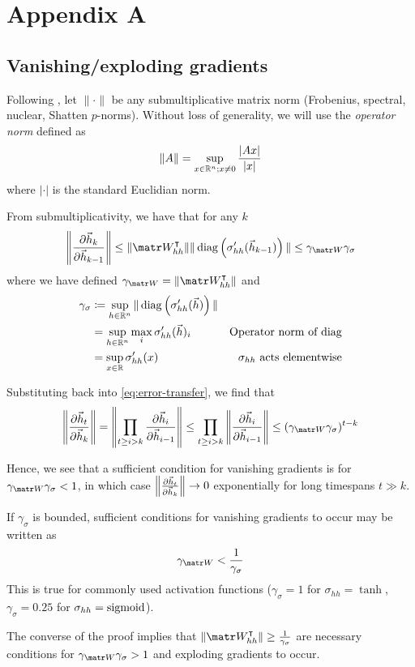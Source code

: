 \chapter{Appendix A}

\section{Vanishing/exploding gradients}\label{sec:vanishing-exploding-gradients}

Following \citet{Pascanu2012}, let $\| \cdot \|$ be any
submultiplicative matrix norm (\eg Frobenius, spectral, nuclear, Shatten
$p$-norms). Without loss of generality, we will use the \emph{operator norm}
defined as
\begin{equation}
    \| A \| = \sup_{x \in \mathbb{R}^n; x \neq 0} \frac{|A x|}{|x|}
\end{equation}
where $|\cdot|$ is the standard Euclidian norm.

From submultiplicativity, we have that for any $k$
\begin{equation}
    \left\| \frac{\pd \h_k}{\pd \h_{k-1}} \right\|
    \leq \| \W_{hh}^\tp \| \| \diag\left( \sigma_{hh}'(\h_{k-1}) \right) \|
    \leq \gamma_{\W} \gamma_\sigma
\end{equation}
where we have defined $\gamma_{\W} = \| \W_{hh}^\tp \|$ and
\begin{align}
    \gamma_\sigma
    &\coloneqq \sup_{h \in \mathbb{R}^n} \| \operatorname*{diag} \left( \sigma_{hh}'(\vec{h}) \right) \|  &\\
    &= \sup_{h \in \mathbb{R}^n} \max_i \sigma_{hh}'(\vec{h})_i &\mbox{Operator norm of diag} \\
    &= \sup_{x \in \mathbb{R}} \sigma_{hh}'(x) &\mbox{$\sigma_{hh}$ acts elementwise}
\end{align}

Substituting back into \cref{eq:error-transfer}, we find that
\begin{equation}
    \left\| \frac{\pd \h_t}{\pd \h_k} \right\|
    = \left\| \prod_{t \geq i > k} \frac{\pd \h_i}{\pd \h_{i-1}} \right\|
    \leq  \prod_{t \geq i > k} \left\| \frac{\pd \h_i}{\pd \h_{i-1}} \right\|
    \leq (\gamma_{\W} \gamma_\sigma)^{t-k}
\end{equation}

Hence, we see that a sufficient condition for vanishing gradients is
for $\gamma_{\W} \gamma_\sigma < 1$, in which case $\left\| \frac{\partial \vec{h}_t}{\partial \vec{h}_k} \right\| \to 0$
exponentially for long timespans $t \gg k$. %

If $\gamma_\sigma$ is bounded, sufficient
conditions for vanishing gradients to occur may be written as
\begin{equation}
    \gamma_{\W} < \frac{1}{\gamma_\sigma}
    \label{eq:vanishing-gradients-suff}
\end{equation}
This is true for commonly used activation functions (\eg $\gamma_\sigma = 1$
for $\sigma_{hh} = \tanh$, $\gamma_\sigma = 0.25$ for $\sigma_{hh} =
\operatorname*{sigmoid}$).

The converse of the proof implies that $\| \W_{hh}^\tp \| \geq
\frac{1}{\gamma_\sigma}$ are necessary conditions for $\gamma_{\W}
\gamma_\sigma > 1$ and exploding gradients to occur.
